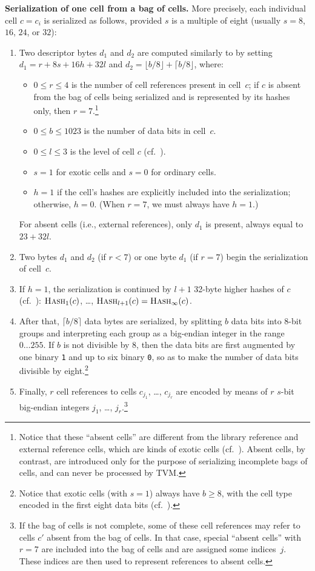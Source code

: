 \documentclass[12pt,oneside]{article}
\def\makepoint#1{\medbreak\noindent{\bf #1.\ }}
\def\nxsubpoint{\refstepcounter{subsubsection}%
  \smallbreak\makepoint{\thesubsubsection}}
\def\emb#1{\textbf{#1.}}
\def\opsc#1{\operatorname{\textsc{#1}}}
\def\Hash{\opsc{Hash}}
\begin{document}
\nxsubpoint\label{sp:boc.cell.repr}\emb{Serialization of one cell from a bag of cells}
More precisely, each individual cell $c=c_i$ is serialized as follows, provided $s$ is a multiple of eight (usually $s=8$, $16$, $24$, or $32$):
\begin{enumerate}
\item Two descriptor bytes $d_1$ and $d_2$ are computed similarly to \cite[3.1.4]{TVM} by setting $d_1=r+8s+16h+32l$ and $d_2=\lfloor b/8\rfloor+\lceil b/8\rfloor$, where:
  \begin{itemize}
  \item $0\leq r\leq 4$ is the number of cell references present in cell~$c$; if $c$ is absent from the bag of cells being serialized and is represented by its hashes only, then $r=7$.\footnote{Notice that these ``absent cells'' are different from the library reference and external reference cells, which are kinds of exotic cells (cf.~\cite[3.1.7]{TVM}). Absent cells, by contrast, are introduced only for the purpose of serializing incomplete bags of cells, and can never be processed by TVM.}
  \item $0\leq b\leq 1023$ is the number of data bits in cell~$c$.
  \item $0\leq l\leq 3$ is the level of cell $c$ (cf.~\cite[3.1.3]{TVM}).
  \item $s=1$ for exotic cells and $s=0$ for ordinary cells.
  \item $h=1$ if the cell's hashes are explicitly included into the serialization; otherwise, $h=0$. (When $r=7$, we must always have $h=1$.)
  \end{itemize}
For absent cells (i.e., external references), only $d_1$ is present, always equal to $23+32l$.
\item Two bytes $d_1$ and $d_2$ (if $r<7$) or one byte $d_1$ (if $r=7$) begin the serialization of cell~$c$.
\item If $h=1$, the serialization is continued by $l+1$ 32-byte higher hashes of $c$ (cf.~\cite[3.1.6]{TVM}): $\Hash_1(c)$, \dots, $\Hash_{l+1}(c)=\Hash_\infty(c)$.
\item After that, $\lceil b/8\rceil$ data bytes are serialized, by splitting $b$ data bits into 8-bit groups and interpreting each group as a big-endian integer in the range $0\ldots255$. If $b$ is not divisible by $8$, then the data bits are first augmented by one binary \texttt{1} and up to six binary \texttt{0}, so as to make the number of data bits divisible by eight.\footnote{Notice that exotic cells (with $s=1$) always have $b\geq8$, with the cell type encoded in the first eight data bits (cf.~\cite[3.1.7]{TVM}).}
\item Finally, $r$ cell references to cells $c_{j_1}$, \dots, $c_{j_r}$ are encoded by means of $r$ $s$-bit big-endian integers $j_1$, \dots, $j_r$.\footnote{If the bag of cells is not complete, some of these cell references may refer to cells $c'$ absent from the bag of cells. In that case, special ``absent cells'' with $r=7$ are included into the bag of cells and are assigned some indices~$j$. These indices are then used to represent references to absent cells.}
\end{enumerate}
\end{document}
